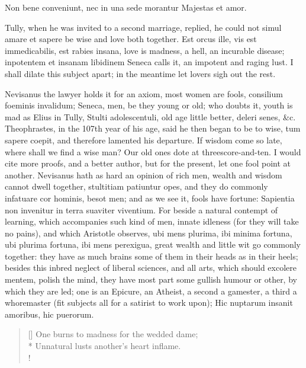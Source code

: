 {Non bene conveniunt, nec in una sede morantur
Majestas et amor.

Tully, when he was invited to a second marriage, replied, he could not
simul amare et sapere be wise and love both together. Est orcus
ille, vis est immedicabilis, est rabies insana, love is madness, a
hell, an incurable disease; inpotentem et insanam libidinem Seneca
calls it, an impotent and raging lust. I shall dilate this subject
apart; in the meantime let lovers sigh out the rest.

Nevisanus the lawyer holds it for an axiom, most women are fools,
consilium foeminis invalidum; Seneca, men, be they young or old;
who doubts it, youth is mad as Elius in Tully, Stulti adolescentuli,
old age little better, deleri senes, \&c. Theophrastes, in the 107th
year of his age, said he then began to be to wise, tum sapere
coepit, and therefore lamented his departure. If wisdom come so late,
where shall we find a wise man? Our old ones dote at
threescore-and-ten. I would cite more proofs, and a better author, but
for the present, let one fool point at another. Nevisanus hath as
hard an opinion of rich men, wealth and wisdom cannot dwell
together, stultitiam patiuntur opes, and they do commonly
infatuare cor hominis, besot men; and as we see it, fools have
fortune: Sapientia non invenitur in terra suaviter viventium. For
beside a natural contempt of learning, which accompanies such kind of
men, innate idleness (for they will take no pains), and which
Aristotle observes, ubi mens plurima, ibi minima fortuna, ubi
plurima fortuna, ibi mens perexigua, great wealth and little wit go
commonly together: they have as much brains some of them in their heads
as in their heels; besides this inbred neglect of liberal sciences, and
all arts, which should excolere mentem, polish the mind, they have most
part some gullish humour or other, by which they are led; one is an
Epicure, an Atheist, a second a gamester, a third a whoremaster (fit
subjects all for a satirist to work upon);
Hic nuptarum insanit amoribus, hic puerorum.

\settowidth{\versewidth}{One burns to madness for the wedded dame;}
\begin{verse}[\versewidth]
One burns to madness for the wedded dame;\\*
Unnatural lusts another's heart inflame.\\!
\end{verse}

}
